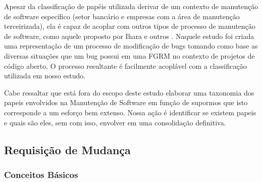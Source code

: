 Apesar da classificação de papéis utilizada derivar de um contexto de manutenção
de software específico (setor bancário e empresas com a área de manutenção
terceirizada), ela é capaz de acoplar com outros tipos de processo de manutenção
de software, como aquele proposto por Ihara e outros
\cite{Ihara:2009:AMI:1595808.1595833}. Naquele estudo foi criada uma
representação de um processo de modificação de bugs tomando como base as
diversas situações que um bug possui em uma FGRM no contexto de projetos de
código aberto. O processo resultante é facilmente acoplável com a classificação
utilizada em nosso estudo.

Cabe ressaltar que está fora do escopo deste estudo elaborar uma taxonomia dos
papeis envolvidos na Manutenção de Software em função de supormos que isto
corresponde a um esforço bem extenso. Nossa ação é identificar se existem papeis
e quais são eles, sem com isso, envolver em uma consolidação definitiva.
\todoend{}

\subsection{Requisição de Mudança}
\label{sec:requisicao_de_mudanca}

\subsubsection{Conceitos Básicos}
\label{subsec:tipos_de_requisicoes_mudanca}




